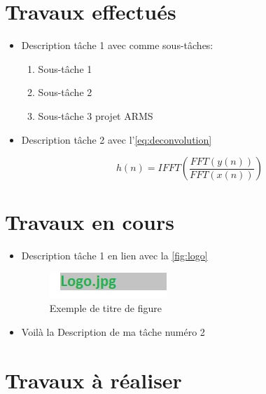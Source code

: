 \documentclass[12pt, a4paper]{article}
\begin{document}
\section{Travaux effectués}

\begin{itemize}
    \item Description tâche 1 avec comme sous-tâches:
          \begin{enumerate}
              \item Sous-tâche 1
              \item Sous-tâche 2
              \item Sous-tâche 3 projet ARMS
          \end{enumerate}
    \item Description tâche 2 avec l'\autoref{eq:deconvolution}

          \begin{equation}
              \label{eq:deconvolution}
              h(n) = IFFT \left( \frac{FFT(y(n))}{FFT(x(n))} \right)
          \end{equation}

\end{itemize}

\section{Travaux en cours}

\begin{itemize}
    \item Description tâche 1 en lien avec la \autoref{fig:logo}

          \begin{figure}[h!]
              \centering
              \includegraphics[width=\linewidth]{../img/logo}
              \caption{Exemple de titre de figure}
              \label{fig:logo}
          \end{figure}

    \item Voilà la Description de ma tâche numéro 2

\end{itemize}

\section{Travaux à réaliser}
\end{document}
